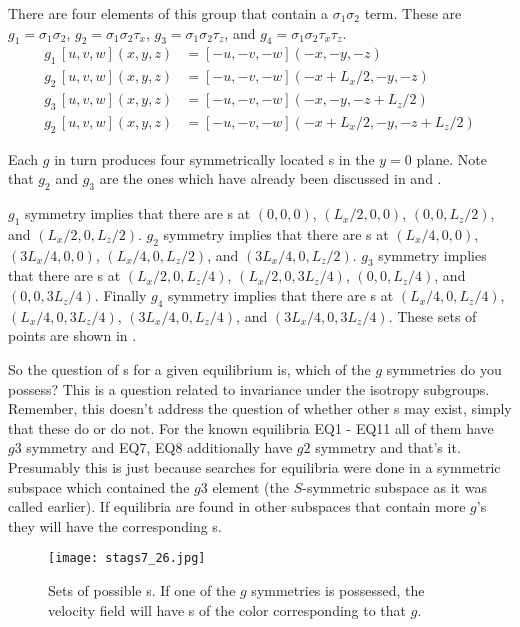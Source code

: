 There are four elements of this group that contain a
$\sigma_{1}\sigma_{2}$ term. These are $g_1 = \sigma_{1}\sigma_{2}$,
$g_2 = \sigma_{1}\sigma_{2}\tau_{x}$, $g_3 =
\sigma_{1}\sigma_{2}\tau_{z}$, and $g_4 = \sigma_{1}\sigma_{2}\tau_x
\tau_z$. 
\begin{align}
g_1 \, [u,v,w](x,y,z) &= [-u,-v,-w](-x,-y,-z)  \\
g_2 \, [u,v,w](x,y,z) &= [-u,-v,-w](-x+L_{x}/2,-y,-z)  \\
g_3 \, [u,v,w](x,y,z) &= [-u,-v,-w](-x,-y,-z+L_{z}/2)  \\
g_2 \, [u,v,w](x,y,z) &= [-u,-v,-w](-x+L_{x}/2,-y,-z+L_{z}/2)
\end{align}

Each $g$ in turn produces four symmetrically located \stagp s in the
$y = 0$ plane. Note that $g_2$ and $g_3$ are the ones which have
already been discussed in  and
.

 $g_1$ symmetry implies that there are \stagp s at $(0,0,0)$, $(L_{x}/2,0,0)$, $(0,0,L_{z}/2)$, and
$(L_{x}/2,0,L_{z}/2)$. $g_2$ symmetry implies that there are \stagp
s at $(L_{x}/4,0,0)$, $(3L_{x}/4,0,0)$, $(L_{x}/4,0,L_{z}/2)$, and
$(3L_{x}/4,0,L_{z}/2)$. $g_3$ symmetry implies that there are \stagp
s at $(L_{x}/2,0,L_{z}/4)$, $(L_{x}/2,0,3L_{z}/4)$, $(0,0,L_{z}/4)$,
and $(0,0,3L_{z}/4)$. Finally $g_4$ symmetry implies that there are
\stagp s at $(L_{x}/4,0,L_{z}/4)$, $(L_{x}/4,0,3L_{z}/4)$,
$(3L_{x}/4,0,L_{z}/4)$, and $(3L_{x}/4,0,3L_{z}/4)$. These sets of
points are shown in .

So the question of \stagp s for a given equilibrium is, which of the
$g$ symmetries do you possess? This is a question related to
invariance under the isotropy subgroups. Remember, this doesn't
address the question of whether other \stagp s may exist, simply
that these do or do not. For the known equilibria EQ1 - EQ11 all of
them have $g3$ symmetry and EQ7, EQ8 additionally have $g2$ symmetry
and that's it. Presumably this is just because searches for
equilibria were done in a symmetric subspace which contained the
$g3$ element (the $S$-symmetric subspace as it was called earlier).
If equilibria are found in other subspaces that contain more $g$'s
they will have the corresponding \stagp s.

\begin{figure}[!h]
\texttt{[image: stags7\_26.jpg]}
  \caption{
   Sets of possible \stagp s. If one of the $g$ symmetries is
   possessed, the velocity field will have \stagp s of the color
   corresponding to that $g$.
   }
  \label{eltonFig:stags7_26}
 \end{figure}



